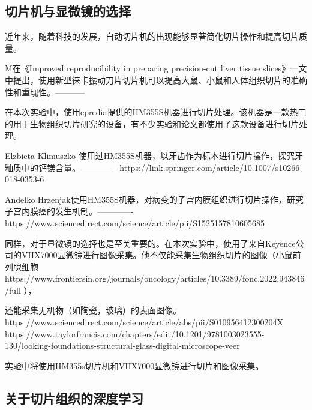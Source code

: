 \subsection{切片机与显微镜的选择}


近年来，随着科技的发展，自动切片机的出现能够显著简化切片操作和提高切片质量。

M在《Improved reproducibility in preparing precision-cut liver tissue slices》一文中提出，使用新型徕卡振动刀片切片机可以提高大鼠、小鼠和人体组织切片的准确性和重现性。-----------



在本次实验中，使用epredia提供的HM355S机器进行切片处理。该机器是一款热门的用于生物组织切片研究的设备，有不少实验和论文都使用了这款设备进行切片处理。

Elzbieta Klimuszko 使用过HM355S机器，以牙齿作为标本进行切片操作，探究牙釉质中的钙镁含量。-------------
https://link.springer.com/article/10.1007/s10266-018-0353-6


Andelko Hrzenjak使用HM355S机器，对病变的子宫内膜组织进行切片操作，研究子宫内膜癌的发生机制。-------------
https://www.sciencedirect.com/science/article/pii/S1525157810605685

同样，对于显微镜的选择也是至关重要的。在本次实验中，使用了来自Keyence公司的VHX7000显微镜进行图像采集。他不仅能采集生物组织切片的图像（小鼠前列腺细胞
https://www.frontiersin.org/journals/oncology/articles/10.3389/fonc.2022.943846/full
），


还能采集无机物（如陶瓷，玻璃）的表面图像。
https://www.sciencedirect.com/science/article/abs/pii/S010956412300204X
https://www.taylorfrancis.com/chapters/edit/10.1201/9781003023555-130/looking-foundations-structural-glass-digital-microscope-veer

实验中将使用HM355s切片机和VHX7000显微镜进行切片和图像采集。





\subsection{关于切片组织的深度学习}

